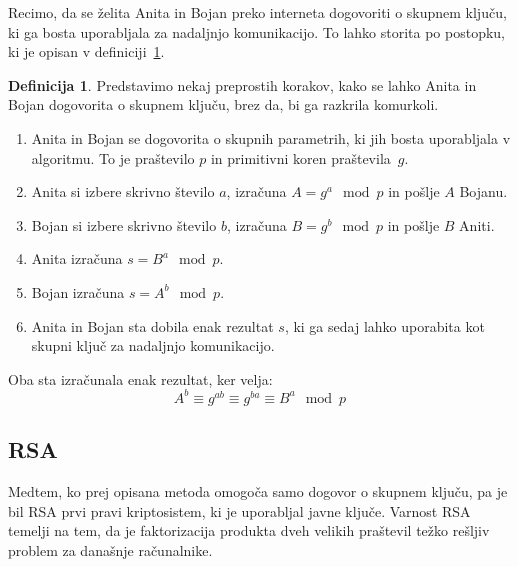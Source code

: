 \documentclass[12pt,a4paper,openany,tikz]{book}
\theoremstyle{plain}
\theoremstyle{definition}
\newtheorem{defn}[thm]{Definicija} %
\begin{document}
Recimo, da se želita Anita in Bojan preko interneta dogovoriti o skupnem ključu, ki ga bosta uporabljala za nadaljnjo komunikacijo. To lahko storita po postopku, ki je opisan v definiciji~\ref{def:dhprob}.

\begin{mdframed}[frametitle={Dogovor o ključu Diffe-Hellman}]
\begin{minipage}{\textwidth}
\begin{defn} Predstavimo nekaj preprostih korakov, kako se lahko Anita in Bojan dogovorita o skupnem ključu, brez da, bi ga razkrila komurkoli.
\begin{enumerate}
	\item Anita in Bojan se dogovorita o skupnih parametrih, ki jih bosta uporabljala v algoritmu. To je praštevilo $p$ in primitivni koren praštevila~$g$.
	\item Anita si izbere skrivno število $a$, izračuna $A=g^a \mod p$ in pošlje $A$ Bojanu.
	\item Bojan si izbere skrivno število $b$, izračuna $B=g^b \mod p$ in pošlje $B$ Aniti.
	\item Anita izračuna $s=B^a \mod p$.
	\item Bojan izračuna $s=A^b \mod p$.
	\item Anita in Bojan sta dobila enak rezultat $s$, ki ga sedaj lahko uporabita kot skupni ključ za nadaljnjo komunikacijo.
\end{enumerate}
Oba sta izračunala enak rezultat, ker velja:
$$
A^b \equiv g^{ab} \equiv g^{ba} \equiv B^a \mod p
$$
\label{def:dhprob}
\end{defn}
\end{minipage}
\end{mdframed}


\subsection*{RSA}
\label{sub:RSA}

Medtem, ko prej opisana metoda omogoča samo dogovor o skupnem ključu, pa je bil \gls{RSA} prvi pravi kriptosistem, ki je uporabljal javne ključe. Varnost \gls{RSA} temelji na tem, da je faktorizacija produkta dveh velikih praštevil težko rešljiv problem za današnje računalnike.
\end{document}
